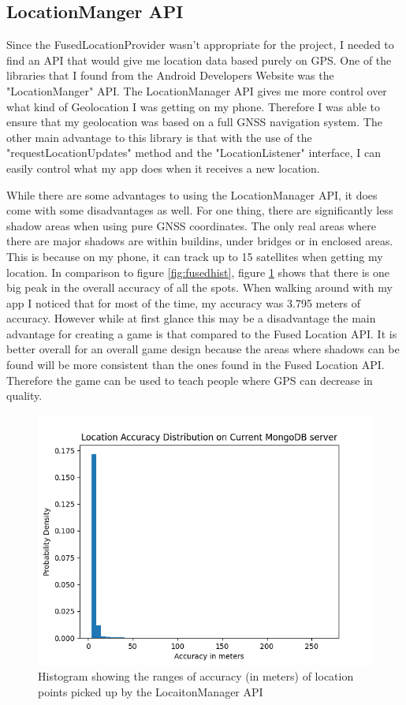 \documentclass{l4proj}
\begin{document}
\subsection{LocationManger API}
\label{locationManager}
Since the FusedLocationProvider wasn't appropriate for the project, I needed to find an API that would give me location data based purely on GPS. One of the libraries that I found
from the Android Developers Website was the "LocationManger" API. The LocationManager API gives me more control over what kind of Geolocation I was getting on my phone. Therefore
I was able to ensure that my geolocation was based on a full GNSS navigation system. \citep{locationManager} The other main advantage to this library is that with the use of the "requestLocationUpdates" method and
the "LocationListener" interface, I can easily control what my app does when it receives a new location.

While there are some advantages to using the LocationManager API, it does come with some disadvantages as well. For one thing, there are significantly less shadow areas when using
pure GNSS coordinates. The only real areas where there are major shadows are within buildins, under bridges or in enclosed areas. This is because on my phone, it can track up to 
15 satellites when getting my location. In comparison to figure \ref{fig:fusedhist}, figure \ref{fig:mongohist} shows that there is one big peak in the overall accuracy of all the spots.
When walking around with my app I noticed that for most of the time, my accuracy was 3.795 meters of accuracy. However while at first glance this may be a disadvantage the main advantage for creating a
game is that compared to the Fused Location API. It is better overall for an overall game design because the areas where shadows can be found will be more consistent than the ones
found in the Fused Location API. Therefore the game can be used to teach people where GPS can decrease in quality.

\begin{figure}
    \centering
    \includegraphics[width=0.6\linewidth]{images/mongo_db_histogram.png}

    \caption{Histogram showing the ranges of accuracy (in meters) of location points picked up by the LocaitonManager API}

    \label{fig:mongohist}
\end{figure}
\end{document}
